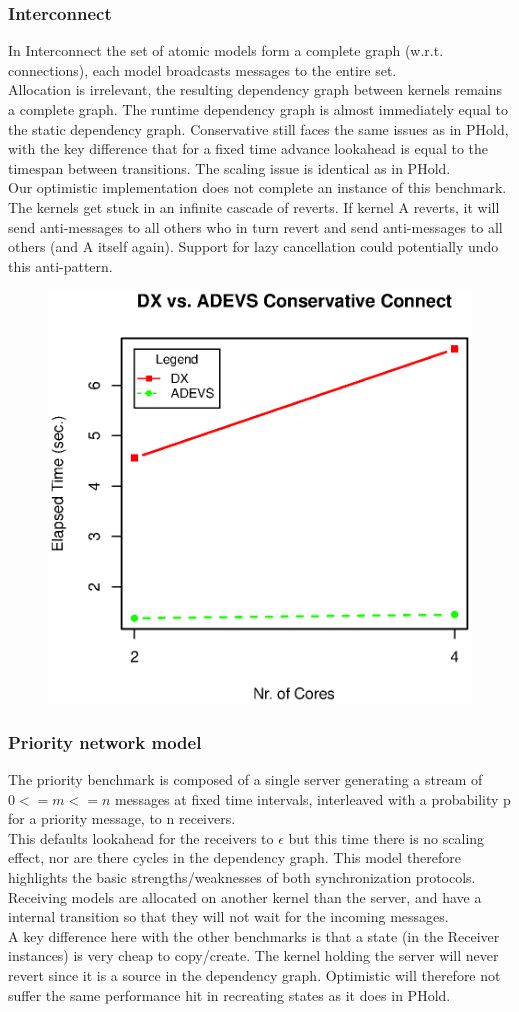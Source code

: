 \subsubsection{Interconnect}
In Interconnect
the set of atomic models form a complete graph (w.r.t. connections), each model broadcasts messages to the entire set. \\
Allocation is irrelevant, the resulting dependency graph between kernels remains  a complete graph. The runtime dependency graph is almost immediately equal to the static dependency graph.
Conservative still faces the same issues as in PHold, with the key difference that for a fixed time advance lookahead is equal to the timespan between transitions. The scaling issue is identical as in PHold.\\
Our optimistic implementation does not complete an instance of this benchmark. The kernels get stuck in an infinite cascade of reverts. If kernel A reverts, it will send anti-messages to all others who in turn revert and send anti-messages to all others (and A itself again). Support for lazy cancellation could potentially undo this anti-pattern.\\
\begin{figure}[h]
	\includegraphics[width=.5\textwidth]{fig/fig4.eps}
	\label{fig4.eps}
\end{figure}
\subsubsection{Priority network model}
The priority benchmark is composed of a single server generating a stream of $0<=m<=n$ messages at fixed time intervals, interleaved with a probability p for a priority message, to n receivers. \\ This defaults lookahead for the receivers to $\epsilon$ but this time there is no scaling effect, nor are there cycles in the dependency graph. This model therefore highlights the basic strengths/weaknesses of both synchronization protocols. Receiving models are allocated on another kernel than the server, and have a internal transition so that they will not wait for the incoming messages. 
 \\
A key difference here with the other benchmarks is that a state (in the Receiver instances) is very cheap to copy/create. The kernel holding the server will never revert since it is a source in the dependency graph. Optimistic will therefore not suffer the same performance hit in recreating states as it does in PHold. 

